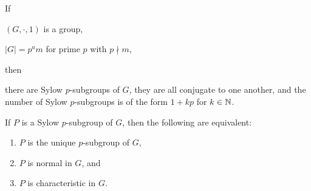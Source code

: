 \documentclass[a5paper]{article}
\begin{document}
\begin{theorem}
  If 
  \begin{premises}
    \item $(G,\cdot,1)$ is a group,
    \item $|G|=p^am$ for prime $p$ with $p\nmid m$,
  \end{premises}
  then
  \begin{conclusion}
    there are Sylow $p$-subgroups of $G$, they are all conjugate to one another,
    and the number of Sylow $p$-subgroups is of the form $1+kp$ for $k\in\mathbb{N}$.
  \end{conclusion}
\end{theorem}

\begin{corollary}
	If $P$ is a Sylow $p$-subgroup of $G$, then the following are equivalent:
  \begin{enumerate}%
    \item $P$ is the unique $p$-subgroup of $G$,
    \item $P$ is normal in $G$, and
    \item $P$ is characteristic in $G$.
  \end{enumerate}
\end{corollary}
\end{document}
